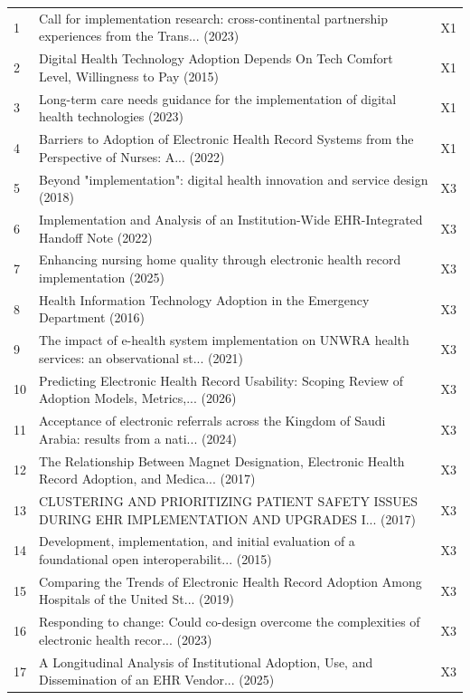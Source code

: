 \begin{longtable}{p{0.8cm} p{11.5cm} p{1.6cm}}
1 & Call for implementation research: cross-continental partnership experiences from the Trans... (2023) & X1 \\
\rowcolor{rowgray}
2 & Digital Health Technology Adoption Depends On Tech Comfort Level, Willingness to Pay (2015) & X1 \\
3 & Long-term care needs guidance for the implementation of digital health technologies (2023) & X1 \\
\rowcolor{rowgray}
4 & Barriers to Adoption of Electronic Health Record Systems from the Perspective of Nurses: A... (2022) & X1 \\
5 & Beyond "implementation": digital health innovation and service design (2018) & X3 \\
\rowcolor{rowgray}
6 & Implementation and Analysis of an Institution-Wide EHR-Integrated Handoff Note (2022) & X3 \\
7 & Enhancing nursing home quality through electronic health record implementation (2025) & X3 \\
\rowcolor{rowgray}
8 & Health Information Technology Adoption in the Emergency Department (2016) & X3 \\
9 & The impact of e-health system implementation on UNWRA health services: an observational st... (2021) & X3 \\
\rowcolor{rowgray}
10 & Predicting Electronic Health Record Usability: Scoping Review of Adoption Models, Metrics,... (2026) & X3 \\
11 & Acceptance of electronic referrals across the Kingdom of Saudi Arabia: results from a nati... (2024) & X3 \\
\rowcolor{rowgray}
12 & The Relationship Between Magnet Designation, Electronic Health Record Adoption, and Medica... (2017) & X3 \\
13 & CLUSTERING AND PRIORITIZING PATIENT SAFETY ISSUES DURING EHR IMPLEMENTATION AND UPGRADES I... (2017) & X3 \\
\rowcolor{rowgray}
14 & Development, implementation, and initial evaluation of a foundational open interoperabilit... (2015) & X3 \\
15 & Comparing the Trends of Electronic Health Record Adoption Among Hospitals of the United St... (2019) & X3 \\
\rowcolor{rowgray}
16 & Responding to change: Could co-design overcome the complexities of electronic health recor... (2023) & X3 \\
17 & A Longitudinal Analysis of Institutional Adoption, Use, and Dissemination of an EHR Vendor... (2025) & X3 \\

\end{longtable}
